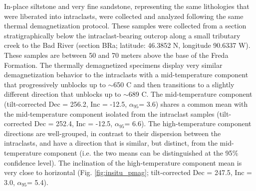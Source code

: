 \documentclass[draft]{agujournal2018}
\begin{document}
In-place siltstone and very fine sandstone, representing the same lithologies that were liberated into intraclasts, were collected and analyzed following the same thermal demagnetization protocol. These samples were collected from a section stratigraphically below the intraclast-bearing outcrop along a small tributary creek to the Bad River (section BRa; latitude: 46.3852 \textdegree N, longitude 90.6337 \textdegree W). These samples are between 50 and 70 meters above the base of the Freda Formation. The thermally demagnetized specimens display very similar demagnetization behavior to the intraclasts with a mid-temperature component that progressively unblocks up to $\sim$650 \textdegree C and then transitions to a slightly different direction that unblocks up to $\sim$689 \textdegree C. The mid-temperature component (tilt-corrected Dec = 256.2, Inc = -12.5, $\alpha_{95}$= 3.6) shares a common mean with the mid-temperature component isolated from the intraclast samples (tilt-corrected Dec = 252.4, Inc = -12.5, $\alpha_{95}$= 6.6). The high-temperature component directions are well-grouped, in contrast to their dispersion between the intraclasts, and have a direction that is similar, but distinct, from the mid-temperature component (i.e. the two means can be distinguished at the 95$\%$ confidence level). The inclination of the high-temperature component mean is very close to horizontal (Fig. \ref{fig:insitu_pmag}; tilt-corrected Dec = 247.5, Inc = 3.0, $\alpha_{95}$= 5.4).
\end{document}

